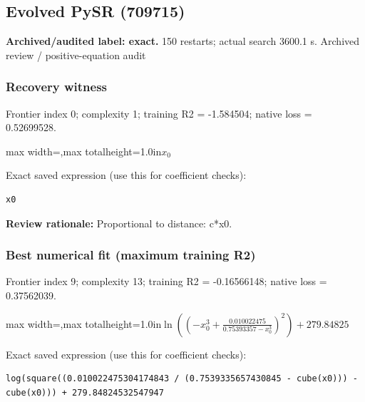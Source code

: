 \documentclass[10pt,letterpaper,landscape]{article}
\begin{document}
\begin{minipage}[t]{0.485\textwidth}
\subsection*{Evolved PySR (709715)}
\textbf{Archived/audited label: exact.} 150 restarts; actual search 3600.1 s.
{\small Archived review / positive-equation audit}
\subsubsection*{Recovery witness}
Frontier index 0; complexity 1; training R2 = -1.584504; native loss = 0.52699528.
\begin{center}\begin{adjustbox}{max width=\linewidth,max totalheight=1.0in}$\displaystyle x_{0}$\end{adjustbox}\end{center}
{\scriptsize Exact saved expression (use this for coefficient checks):}
\begin{lstlisting}
x0
\end{lstlisting}
{\small\textbf{Review rationale:} Proportional to distance: c*x0.}
\subsubsection*{Best numerical fit (maximum training R2)}
Frontier index 9; complexity 13; training R2 = -0.16566148; native loss = 0.37562039.
\begin{center}\begin{adjustbox}{max width=\linewidth,max totalheight=1.0in}$\displaystyle \ln{\left(\left(- x_{0}^{3} + \frac{0.010022475}{0.75393357 - x_{0}^{3}}\right)^{2} \right)} + 279.84825$\end{adjustbox}\end{center}
{\scriptsize Exact saved expression (use this for coefficient checks):}
\begin{lstlisting}
log(square((0.010022475304174843 / (0.7539335657430845 - cube(x0))) - cube(x0))) + 279.84824532547947
\end{lstlisting}
\end{minipage}
\clearpage{}\label{hubble-10002}
\end{document}

